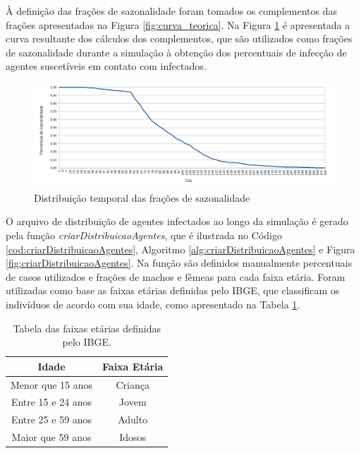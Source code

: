 À definição das frações de sazonalidade foram tomados os complementos das frações apresentadas na Figura \ref{fig:curva_teorica}. Na Figura \ref{fig:percentuais_sazonalidade} é apresentada a curva resultante dos cálculos dos complementos, que são utilizados como frações de sazonalidade durante a simulação à obtenção dos percentuais de infecção de agentes suscetíveis em contato com infectados. 

\begin{figure}[H]
  \centering
  \includegraphics[width=1\textwidth]{Figuras/TratamentosDados/Sazonalidade.png}
  \caption{Distribuição temporal das frações de sazonalidade}
  \label{fig:percentuais_sazonalidade}
\end{figure} 

O arquivo de distribuição de agentes infectados ao longo da simulação é gerado pela função \textit{criarDistribuicaoAgentes}, que é ilustrada no Código \ref{cod:criarDistribuicaoAgentes}, Algoritmo \ref{alg:criarDistribuicaoAgentes} e Figura \ref{fig:criarDistribuicaoAgentes}. Na função são definidos manualmente percentuais de casos utilizados e frações de machos e fêmeas para cada faixa etária. Foram utilizadas como base as faixas etárias definidas pelo IBGE, que classificam os indivíduos de acordo com sua idade, como apresentado na Tabela \ref{tab:faixasEtariasIBGE}.  

\begin{table}[H]
\centering
\begin{tabular}{c|c}
 \textbf{Idade} 	& \textbf{Faixa Etária}	\\ \hline
 Menor que 15 anos 	& Criança		\\
 Entre 15 e 24 anos 	& Jovem			\\
 Entre 25 e 59 anos 	& Adulto		\\
 Maior que 59 anos 	& Idosos		\\
\end{tabular}
\caption{Tabela das faixas etárias definidas pelo IBGE.}
\label{tab:faixasEtariasIBGE}
\end{table}


